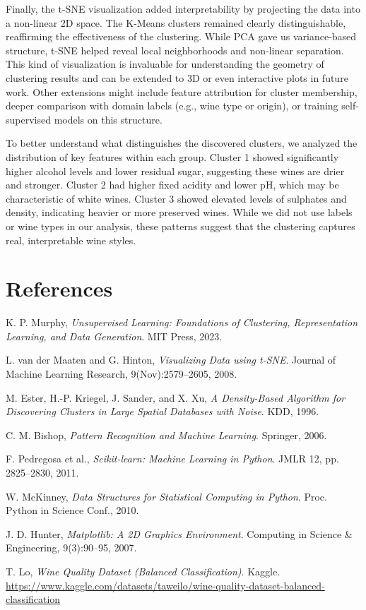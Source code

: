 \documentclass[12pt]{article}
\begin{document}
Finally, the t-SNE visualization added interpretability by projecting the data into a non-linear 2D space. The K-Means clusters remained clearly distinguishable, reaffirming the effectiveness of the clustering. While PCA gave us variance-based structure, t-SNE helped reveal local neighborhoods and non-linear separation. This kind of visualization is invaluable for understanding the geometry of clustering results and can be extended to 3D or even interactive plots in future work. Other extensions might include feature attribution for cluster membership, deeper comparison with domain labels (e.g., wine type or origin), or training self-supervised models on this structure.

To better understand what distinguishes the discovered clusters, we analyzed the distribution of key features within each group. Cluster 1 showed significantly higher alcohol levels and lower residual sugar, suggesting these wines are drier and stronger. Cluster 2 had higher fixed acidity and lower pH, which may be characteristic of white wines. Cluster 3 showed elevated levels of sulphates and density, indicating heavier or more preserved wines. While we did not use labels or wine types in our analysis, these patterns suggest that the clustering captures real, interpretable wine styles.

\section*{References}

\begin{thebibliography}{9}

K. P. Murphy, \textit{Unsupervised Learning: Foundations of Clustering, Representation Learning, and Data Generation}. MIT Press, 2023.

L. van der Maaten and G. Hinton, \textit{Visualizing Data using t-SNE}. Journal of Machine Learning Research, 9(Nov):2579–2605, 2008.

M. Ester, H.-P. Kriegel, J. Sander, and X. Xu, \textit{A Density-Based Algorithm for Discovering Clusters in Large Spatial Databases with Noise}. KDD, 1996.

C. M. Bishop, \textit{Pattern Recognition and Machine Learning}. Springer, 2006.

F. Pedregosa et al., \textit{Scikit-learn: Machine Learning in Python}. JMLR 12, pp. 2825–2830, 2011.

W. McKinney, \textit{Data Structures for Statistical Computing in Python}. Proc. Python in Science Conf., 2010.

J. D. Hunter, \textit{Matplotlib: A 2D Graphics Environment}. Computing in Science \& Engineering, 9(3):90–95, 2007.

T. Lo, \textit{Wine Quality Dataset (Balanced Classification)}. Kaggle. \url{https://www.kaggle.com/datasets/taweilo/wine-quality-dataset-balanced-classification}

\end{thebibliography}
\end{document}
